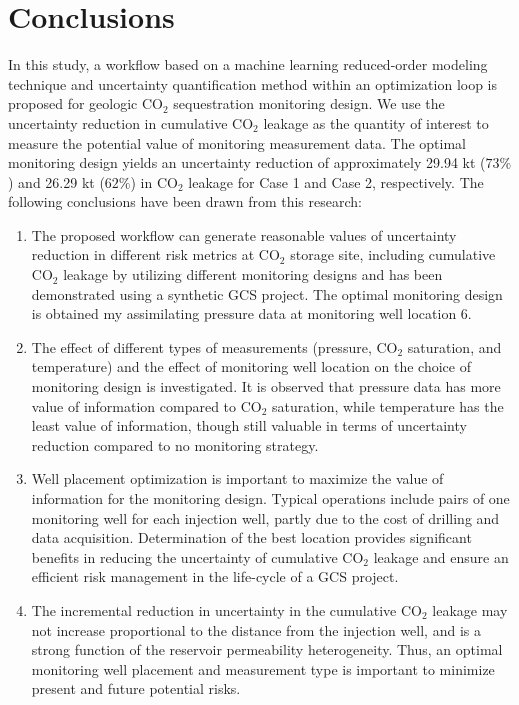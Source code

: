 \documentclass[a4paper,fleqn]{cas-sc}
\begin{document}
\section{Conclusions}
In this study, a workflow based on a machine learning reduced-order modeling technique and uncertainty quantification method within an optimization loop is proposed for geologic CO$_2$ sequestration monitoring design. We use the uncertainty reduction in cumulative CO$_2$ leakage as the quantity of interest to measure the potential value of monitoring measurement data. The optimal monitoring design yields an uncertainty reduction of approximately 29.94 kt ($73\%$) and 26.29 kt ($62\%$) in CO$_2$ leakage for Case 1 and Case 2, respectively. The following conclusions have been drawn from this research:
\begin{enumerate}
    \item The proposed workflow can generate reasonable values of uncertainty reduction in different risk metrics at CO$_2$ storage site, including cumulative CO$_2$ leakage by utilizing different monitoring designs and has been demonstrated using a synthetic GCS project. The optimal monitoring design is obtained my assimilating pressure data at monitoring well location 6.
    
    \item The effect of different types of measurements (pressure, CO$_2$ saturation, and temperature) and the effect of monitoring well location on the choice of monitoring design is investigated. It is observed that pressure data has more value of information compared to CO$_2$ saturation, while temperature has the least value of information, though still valuable in terms of uncertainty reduction compared to no monitoring strategy.
    
    \item Well placement optimization is important to maximize the value of information for the monitoring design. Typical operations include pairs of one monitoring well for each injection well, partly due to the cost of drilling and data acquisition. Determination of the best location provides significant benefits in reducing the uncertainty of cumulative CO$_2$ leakage and ensure an efficient risk management in the life-cycle of a GCS project.
    
    \item The incremental reduction in uncertainty in the cumulative CO$_2$ leakage may not increase proportional to the distance from the injection well, and is a strong function of the reservoir permeability heterogeneity. Thus, an optimal monitoring well placement and measurement type is important to minimize present and future potential risks.
    

\end{enumerate}
\end{document}
